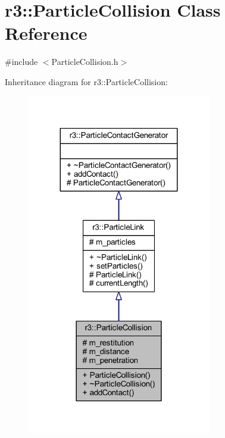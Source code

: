 \hypertarget{classr3_1_1_particle_collision}{}\section{r3\+:\+:Particle\+Collision Class Reference}
\label{classr3_1_1_particle_collision}


{\ttfamily \#include $<$Particle\+Collision.\+h$>$}



Inheritance diagram for r3\+:\+:Particle\+Collision\+:\nopagebreak
\begin{figure}[H]
\begin{center}
\leavevmode
\includegraphics[width=227pt]{classr3_1_1_particle_collision__inherit__graph}
\end{center}
\end{figure}


